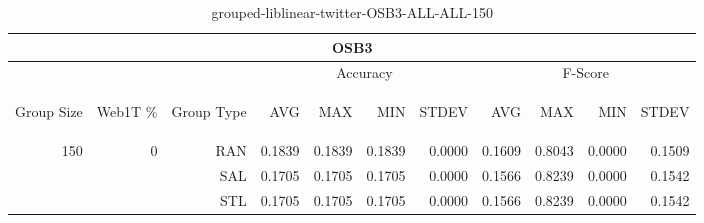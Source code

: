 \begin{center}
\begin{table}[htbp]
\begin{tabular}{ | r | r | r | r | r | r | r | r | r | r | r |}
\hline
\multicolumn{11}{|c|}{OSB3}\\
\hline
 & & & \multicolumn{4}{|c|}{Accuracy} & \multicolumn{4}{|c|}{F-Score}\\ \cline{4-11}
\begin{sideways}Group Size\end{sideways} & \begin{sideways}Web1T \%\end{sideways} & \begin{sideways}Group Type\end{sideways} & \begin{sideways}AVG\end{sideways} & \begin{sideways}MAX\end{sideways} & \begin{sideways}MIN\end{sideways} & \begin{sideways}STDEV\end{sideways} & \begin{sideways}AVG\end{sideways} & \begin{sideways}MAX\end{sideways} & \begin{sideways}MIN\end{sideways} & \begin{sideways}STDEV\end{sideways}\\
\hline
\multirow{3}{*}{150}
 & \multirow{3}{*}{0} & RAN & 0.1839 & 0.1839 & 0.1839 & 0.0000 & 0.1609 & 0.8043 & 0.0000 & 0.1509\\ \cline{3-11}
 &   & SAL & 0.1705 & 0.1705 & 0.1705 & 0.0000 & 0.1566 & 0.8239 & 0.0000 & 0.1542\\ \cline{3-11}
 &   & STL & 0.1705 & 0.1705 & 0.1705 & 0.0000 & 0.1566 & 0.8239 & 0.0000 & 0.1542\\ \cline{2-11}
\hline
\end{tabular}
\caption{grouped-liblinear-twitter-OSB3-ALL-ALL-150}
\end{table}
\end{center}

